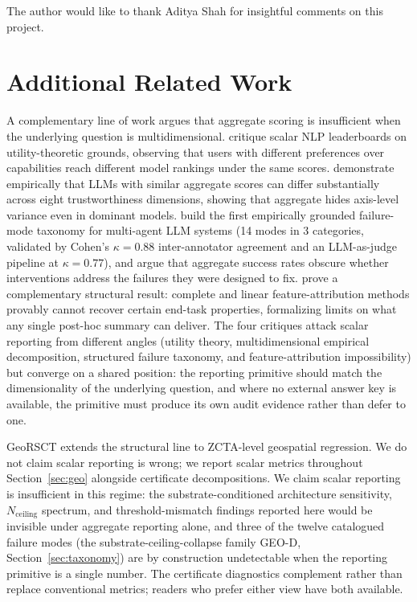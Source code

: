 \documentclass{article}
\begin{document}
The author would like to thank Aditya Shah for insightful comments on this project.




\appendix

\section{Additional Related Work}
\label{app:additional_related}

A complementary line of work argues that aggregate scoring is insufficient when the underlying question is multidimensional. \citet{ethayarajh2020utility} critique scalar NLP leaderboards on utility-theoretic grounds, observing that users with different preferences over capabilities reach different model rankings under the same scores. \citet{wang2023decodingtrust} demonstrate empirically that LLMs with similar aggregate scores can differ substantially across eight trustworthiness dimensions, showing that aggregate hides axis-level variance even in dominant models. \citet{cemri2025mast} build the first empirically grounded failure-mode taxonomy for multi-agent LLM systems (14 modes in 3 categories, validated by Cohen's $\kappa = 0.88$ inter-annotator agreement and an LLM-as-judge pipeline at $\kappa = 0.77$), and argue that aggregate success rates obscure whether interventions address the failures they were designed to fix. \citet{bilodeau2024impossibility} prove a complementary structural result: complete and linear feature-attribution methods provably cannot recover certain end-task properties, formalizing limits on what any single post-hoc summary can deliver. The four critiques attack scalar reporting from different angles (utility theory, multidimensional empirical decomposition, structured failure taxonomy, and feature-attribution impossibility) but converge on a shared position: the reporting primitive should match the dimensionality of the underlying question, and where no external answer key is available, the primitive must produce its own audit evidence rather than defer to one.

GeoRSCT extends the structural line to ZCTA-level geospatial regression. We do not claim scalar reporting is wrong; we report scalar metrics throughout Section~\ref{sec:geo} alongside certificate decompositions. We claim scalar reporting is insufficient in this regime: the substrate-conditioned architecture sensitivity, $N_{\text{ceiling}}$ spectrum, and threshold-mismatch findings reported here would be invisible under aggregate reporting alone, and three of the twelve catalogued failure modes (the substrate-ceiling-collapse family GEO-D, Section~\ref{sec:taxonomy}) are by construction undetectable when the reporting primitive is a single number. The certificate diagnostics complement rather than replace conventional metrics; readers who prefer either view have both available.
\end{document}
